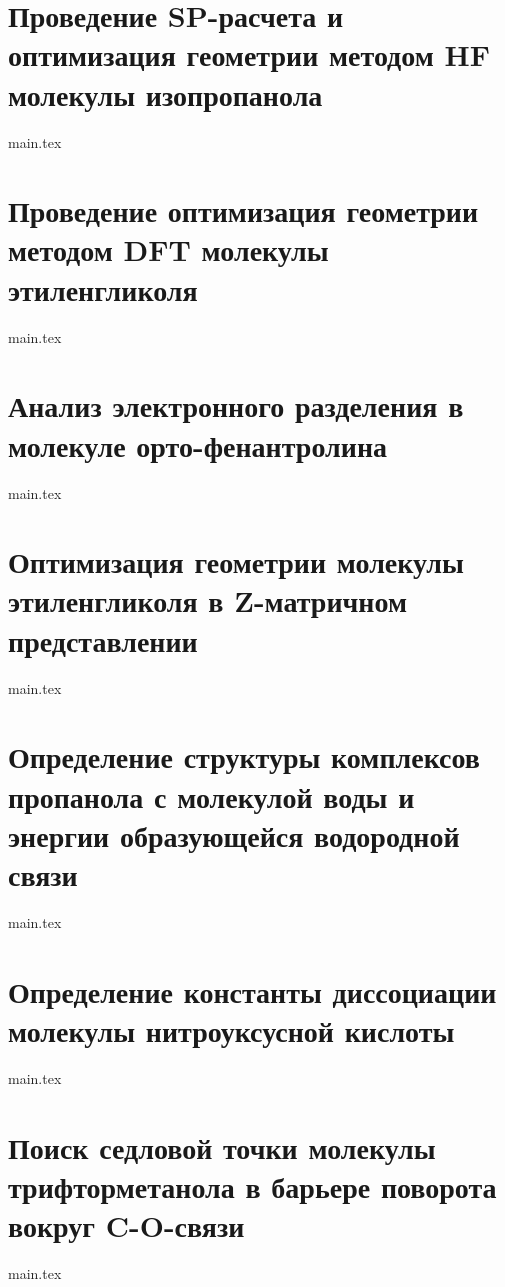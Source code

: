 \documentclass[12pt,a4paper]{article}
\begin{document}






\newpage
\section{Проведение SP-расчета и оптимизация геометрии методом HF молекулы изопропанола}
{main.tex}

\newpage
\section{Проведение оптимизация геометрии методом DFT молекулы этиленгликоля}
{main.tex}

\newpage
\section{Анализ электронного разделения в молекуле орто-фенантролина}
{main.tex}

\newpage
\section{Оптимизация геометрии молекулы этиленгликоля в Z-матричном представлении}
{main.tex}

\newpage
\section{Определение структуры комплексов пропанола с молекулой воды и энергии образующейся водородной связи}
{main.tex}

\newpage
\section{Определение константы диссоциации молекулы нитроуксусной кислоты}
{main.tex}

\newpage
\section{Поиск седловой точки молекулы трифторметанола в барьере поворота вокруг C-O-связи}
{main.tex}
\end{document}
